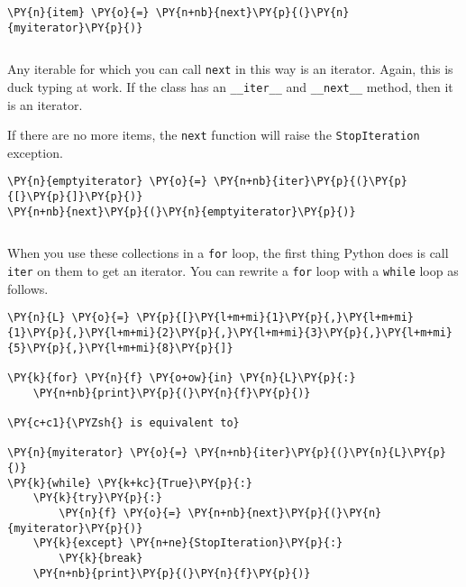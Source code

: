 \begin{Verbatim}[commandchars=\\\{\}]
\PY{n}{item} \PY{o}{=} \PY{n+nb}{next}\PY{p}{(}\PY{n}{myiterator}\PY{p}{)}
\end{Verbatim}

\begin{Verbatim}

\end{Verbatim}


Any iterable for which you can call \texttt{next} in this way is an iterator.  Again, this is duck typing at work.  If the class has an \texttt{\_\_iter\_\_} and \texttt{\_\_next\_\_} method, then it is an iterator.


If there are no more items, the \texttt{next} function will raise the \texttt{StopIteration} exception.


\begin{Verbatim}[commandchars=\\\{\}]
\PY{n}{emptyiterator} \PY{o}{=} \PY{n+nb}{iter}\PY{p}{(}\PY{p}{[}\PY{p}{]}\PY{p}{)}
\PY{n+nb}{next}\PY{p}{(}\PY{n}{emptyiterator}\PY{p}{)}
\end{Verbatim}

\begin{Verbatim}

\end{Verbatim}


When you use these collections in a \texttt{for} loop, the first thing Python does is call \texttt{iter} on them to get an iterator.   You can rewrite a \texttt{for} loop with a \texttt{while} loop as follows.


\begin{Verbatim}[commandchars=\\\{\}]
\PY{n}{L} \PY{o}{=} \PY{p}{[}\PY{l+m+mi}{1}\PY{p}{,}\PY{l+m+mi}{1}\PY{p}{,}\PY{l+m+mi}{2}\PY{p}{,}\PY{l+m+mi}{3}\PY{p}{,}\PY{l+m+mi}{5}\PY{p}{,}\PY{l+m+mi}{8}\PY{p}{]}

\PY{k}{for} \PY{n}{f} \PY{o+ow}{in} \PY{n}{L}\PY{p}{:}
    \PY{n+nb}{print}\PY{p}{(}\PY{n}{f}\PY{p}{)}

\PY{c+c1}{\PYZsh{} is equivalent to}

\PY{n}{myiterator} \PY{o}{=} \PY{n+nb}{iter}\PY{p}{(}\PY{n}{L}\PY{p}{)}
\PY{k}{while} \PY{k+kc}{True}\PY{p}{:}
    \PY{k}{try}\PY{p}{:}
        \PY{n}{f} \PY{o}{=} \PY{n+nb}{next}\PY{p}{(}\PY{n}{myiterator}\PY{p}{)}
    \PY{k}{except} \PY{n+ne}{StopIteration}\PY{p}{:}
        \PY{k}{break}
    \PY{n+nb}{print}\PY{p}{(}\PY{n}{f}\PY{p}{)}
\end{Verbatim}

